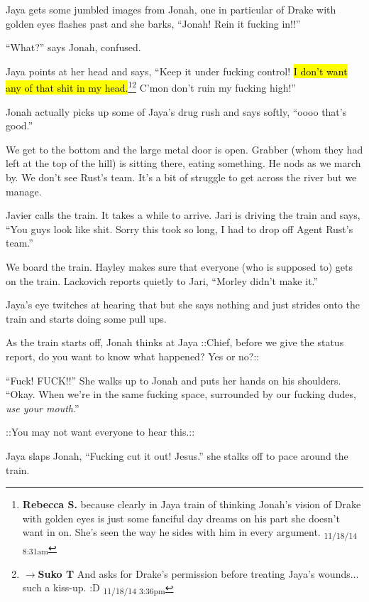 Jaya gets some jumbled images from Jonah, one in particular of Drake with golden eyes flashes past and she barks, ``Jonah!  Rein it fucking in!!''

``What?'' says Jonah, confused.

Jaya points at her head and says, ``Keep it under fucking control!  \hl{I don't want any of that shit in my head.}\footnote{\textbf{Rebecca S. }because clearly in Jaya train of thinking Jonah's vision of Drake with golden eyes is just some fanciful day dreams on his part she doesn't want in on.  She's seen the way he sides with him in every argument. \textsubscript{11/18/14 8:31am}}\footnote{$\rightarrow$\textbf{Suko T }And asks for Drake's permission before treating Jaya's wounds... such a kiss-up. :D \textsubscript{11/18/14 3:36pm}}  C'mon don't ruin my fucking high!''

Jonah actually picks up some of Jaya's drug rush and says softly, ``oooo that's good.''



We get to the bottom and the large metal door is open.  Grabber (whom they had left at the top of the hill) is sitting there, eating something.  He nods as we march by.  We don't see Rust's team.  It's a bit of struggle to get across the river but we manage.



Javier calls the train.  It takes a while to arrive.  Jari is driving the train and says, ``You guys look like shit.  Sorry this took so long, I had to drop off Agent Rust's team.''

We board the train.   Hayley makes sure that everyone (who is supposed to) gets on the train.  Lackovich reports quietly to Jari, ``Morley didn't make it.''

Jaya's eye twitches at hearing that but she says nothing and just strides onto the train and starts doing some pull ups.



As the train starts off, Jonah thinks at Jaya  {\color[RGB]{74,134,232}::Chief, before we give the status report, do you want to know what happened?  Yes or no?::} 

``Fuck!  FUCK!!'' She walks up to Jonah and puts her hands on his shoulders.  ``Okay.  When we're in the same fucking space, surrounded by our fucking dudes, \textit{use your mouth}.''

 {\color[RGB]{74,134,232}::You may not want everyone to hear this.::} 

Jaya slaps Jonah, ``Fucking cut it out!  Jesus.'' she stalks off to pace around the train.


